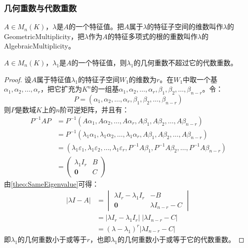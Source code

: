 \subsubsection{几何重数与代数重数}
\begin{definition}
	$A\in M_{n}(K)$，$\lambda$是$A$的一个特征值。把$A$属于$\lambda$的特征子空间的维数叫作$\lambda$的\gls{GeometricMultiplicity}，把$\lambda$作为$A$的特征多项式的根的重数叫作$\lambda$的\gls{AlgebraicMultiplicity}。
\end{definition}
\begin{theorem}\label{theo:AlgebraicMultiplicityGeometricMultiplicity}
	$A\in M_{n}(K)$，$\lambda_1$是$A$的一个特征值，则$\lambda_1$的几何重数不超过它的代数重数。
\end{theorem}
\begin{proof}
	设$A$属于特征值$\lambda_1$的特征子空间$W_1$的维数为$r$。在$W_1$中取一个基$\alpha_1,\alpha_2,\dots,\alpha_r$，把它扩充为$K^n$的一组基$\alpha_1,\alpha_2,\dots,\alpha_r,\beta_1,\beta_2,\dots,\beta_{n-r}$。令：
	\begin{equation*}
		P=(\alpha_1,\alpha_2,\dots,\alpha_r,\beta_1,\beta_2,\dots,\beta_{n-r})
	\end{equation*}
	则$P$是数域$K$上的$n$阶可逆矩阵，并且有：
	\begin{align*}
		P^{-1}AP
		&=P^{-1}(A\alpha_1,A\alpha_2,\dots,A\alpha_r,A\beta_1,A\beta_2,\dots,A\beta_{n-r}) \\
		&=P^{-1}(\lambda_1\alpha_1,\lambda_1\alpha_2,\dots,\lambda_1\alpha_r,A\beta_1,A\beta_2,\dots,A\beta_{n-r}) \\
		&=(\lambda_1\varepsilon_1,\lambda_1\varepsilon_2,\dots,\lambda_1\varepsilon_r,P^{-1}A\beta_1,P^{-1}A\beta_2,\dots,P^{-1}A\beta_{n-r}) \\
		&=
		\begin{pmatrix}
			\lambda_1I_r & B \\
			\mathbf{0} & C
		\end{pmatrix}
	\end{align*}
	由\cref{theo:SameEigenvalue}可得：
	\begin{align*}
		|\lambda I-A|&=
		\begin{vmatrix}
			\lambda I_r-\lambda_1I_r & -B \\
			\mathbf{0} & \lambda I_{n-r}-C
		\end{vmatrix} \\
		&=|\lambda I_r-\lambda_1I_r|\;|\lambda I_{n-r}-C| \\
		&=(\lambda-\lambda_1)^r|\lambda I_{n-r}-C|
	\end{align*}
	即$\lambda_1$的几何重数小于或等于$r$，也即$\lambda_1$的几何重数小于或等于它的代数重数。
\end{proof}

